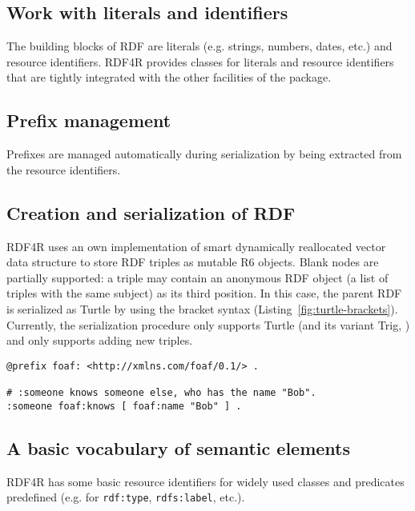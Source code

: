 \subsection{Work with literals and identifiers}

The building blocks of RDF are literals (e.g. strings, numbers, dates, etc.) and resource identifiers. RDF4R provides classes for literals and resource identifiers that are tightly integrated with the other facilities of the package.

\subsection{Prefix management}

Prefixes are managed automatically during serialization by being extracted from the resource identifiers.

\subsection{Creation and serialization of RDF}

RDF4R uses an own implementation of smart dynamically reallocated vector data structure to store RDF triples as mutable R6 objects. Blank nodes are partially supported: a triple may contain an anonymous RDF object (a list of triples with the same subject) as its third position. In this case, the parent RDF is serialized as Turtle by using the bracket syntax (Listing~\ref{fig:turtle-brackets}). Currently, the serialization procedure only supports Turtle (and its variant Trig, \cite{bizer_rdf_2014}) and only supports adding new triples.

\begin{lstlisting}[language=SPARQL,
caption=Using brackets to express RDF blank nodes in Turtle/TriG.,
label=fig:turtle-brackets,
basicstyle=\ttfamily\tiny]
@prefix foaf: <http://xmlns.com/foaf/0.1/> .

# :someone knows someone else, who has the name "Bob".
:someone foaf:knows [ foaf:name "Bob" ] .
\end{lstlisting}

\subsection{A basic vocabulary of semantic elements}

RDF4R has some basic resource identifiers for widely used classes and predicates predefined (e.g. for {\tt rdf:type}, {\tt rdfs:label}, etc.).

